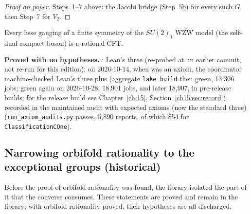 \begin{proof}[Proof on paper]
Steps~1--7 above: the Jacobi bridge (Step~5b) for every such $G$, then Step~7 for $V_2$.
\end{proof}

\begin{physics}
Every lisse gauging of a finite symmetry of the $SU(2)_1$ WZW model (the self-dual compact boson) is a rational CFT.
\end{physics}

\begin{status}
\textbf{Proved with no hypotheses.} : Lean's three (re-probed at an earlier commit, not re-run for this edition); on 2026-10-14, when  was an
axiom, the coordinator machine-checked Lean's three plus  (aggregate \texttt{lake build} then green, 13,306
jobs; green again on 2026-10-28, 18{,}901 jobs, and later 18{,}907, in pre-release builds; for the release build see Chapter~\ref{ch:15}, Section~\ref{ch15:sec:record}), recorded in the maintained audit with expected axioms  (now the standard three) (\texttt{run\_axiom\_audits.py} passes, 5,890 reports, of which 854 for
\texttt{ClassificationCOne}).
\end{status}

\subsection{Narrowing orbifold rationality to the exceptional groups (historical)}

Before the proof of orbifold rationality was found, the library isolated the part of it that the converse consumes.
These statements are proved and remain in the library; with orbifold rationality proved, their hypotheses are all
discharged.

